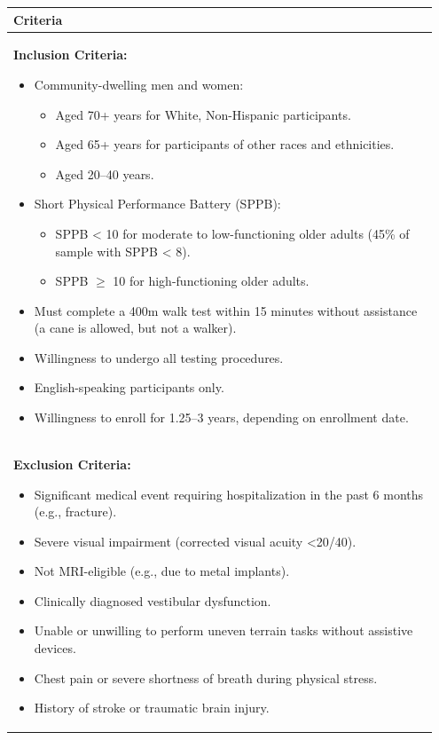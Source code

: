 \documentclass[a4paper,fleqn]{cas-sc}
\begin{document}
\begin{longtable}{|p{0.95\linewidth}|}
\hline
\rowcolor[HTML]{C0C0C0} 
\textbf{Criteria} \\ 
\hline
\textbf{Inclusion Criteria:}
\begin{itemize}
    \item Community-dwelling men and women:
        \begin{itemize}
            \item Aged 70+ years for White, Non-Hispanic participants.
            \item Aged 65+ years for participants of other races and ethnicities.
            \item Aged 20–40 years.
        \end{itemize}
    \item Short Physical Performance Battery (SPPB):
        \begin{itemize}
            \item SPPB < 10 for moderate to low-functioning older adults (45\% of sample with SPPB < 8).
            \item SPPB $\geq$ 10 for high-functioning older adults.
        \end{itemize}
    \item Must complete a 400m walk test within 15 minutes without assistance (a cane is allowed, but not a walker).
    \item Willingness to undergo all testing procedures.
    \item English-speaking participants only.
    \item Willingness to enroll for 1.25–3 years, depending on enrollment date.
\end{itemize} \\ 
\hline
\textbf{Exclusion Criteria:}
\begin{itemize}
    \item Significant medical event requiring hospitalization in the past 6 months (e.g., fracture).
    \item Severe visual impairment (corrected visual acuity <20/40).
    \item Not MRI-eligible (e.g., due to metal implants).
    \item Clinically diagnosed vestibular dysfunction.
    \item Unable or unwilling to perform uneven terrain tasks without assistive devices.
    \item Chest pain or severe shortness of breath during physical stress.
    \item History of stroke or traumatic brain injury.

\end{itemize}
\end{longtable}
\end{document}
